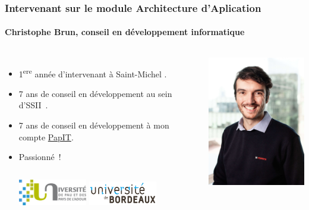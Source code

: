 \documentclass{beamer}
\begin{document}
    \begin{frame}
        \transdissolve
        \frametitle{Intervenant sur le module Architecture d'Aplication}
        \framesubtitle{Christophe Brun, conseil en développement informatique}

        \begin{columns}
            \begin{itemize}
                \item 1\textsuperscript{ere} année d'intervenant à Saint-Michel .

                \item 7 ans de conseil en développement au sein d'SSII~.

                \item 7 ans de conseil en développement à mon compte \href{https://papit.fr}{PapIT}.

                \item Passionné~!
                \bigbreak
                \begin{columns}
                    \centering
                    \includegraphics[width=3cm]{image/logo-uppa}
                    \centering
                    \includegraphics[width=3cm]{image/logo-universite-bordeaux}
                \end{columns}
            \end{itemize}
            \centering
            \includegraphics[width=5cm]{image/trombine-christophe}
        \end{columns}
    \end{frame}
\end{document}
